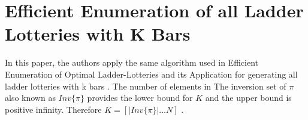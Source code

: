 \section{Efficient Enumeration of all Ladder Lotteries with K Bars}

In this paper, the authors apply the same algorithm used in Efficient Enumeration of Optimal Ladder-Lotteries 
and its Application for generating all ladder lotteries with k bars \cite{A4}. The number of elements 
in The inversion set of $\pi$ also known as $Inv\{\pi\}$ provides the lower bound for $K$ 
and the upper bound is positive infinity. Therefore $K=[|Inv\{\pi\}| \dots N]$ \cite{A4}.\par